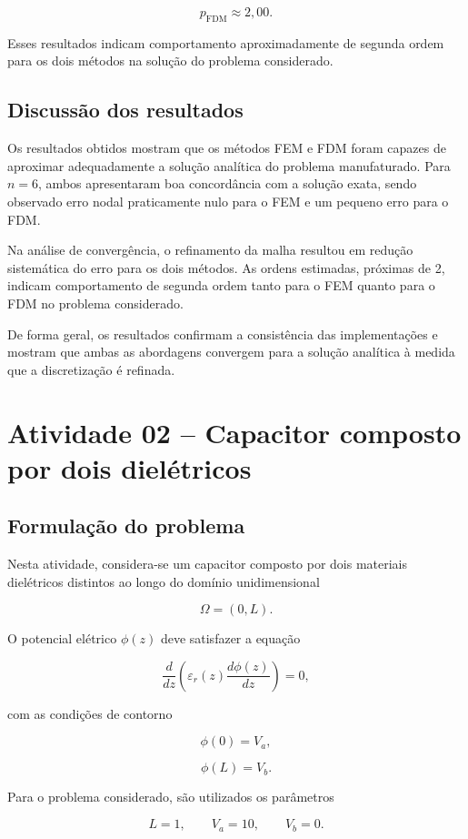 \[
p_{\mathrm{FDM}} \approx 2,00.
\]

Esses resultados indicam comportamento aproximadamente de segunda ordem para os dois métodos na solução do problema considerado.

\subsection{Discussão dos resultados}

Os resultados obtidos mostram que os métodos FEM e FDM foram capazes de aproximar adequadamente a solução analítica do problema manufaturado. Para \(n=6\), ambos apresentaram boa concordância com a solução exata, sendo observado erro nodal praticamente nulo para o FEM e um pequeno erro para o FDM.

Na análise de convergência, o refinamento da malha resultou em redução sistemática do erro para os dois métodos. As ordens estimadas, próximas de 2, indicam comportamento de segunda ordem tanto para o FEM quanto para o FDM no problema considerado.

De forma geral, os resultados confirmam a consistência das implementações e mostram que ambas as abordagens convergem para a solução analítica à medida que a discretização é refinada.

\section{Atividade 02 -- Capacitor composto por dois dielétricos}

\subsection{Formulação do problema}

Nesta atividade, considera-se um capacitor composto por dois materiais dielétricos distintos ao longo do domínio unidimensional

\[
\Omega = (0,L).
\]

O potencial elétrico \(\phi(z)\) deve satisfazer a equação

\[
\frac{d}{dz}
\left(
\varepsilon_r(z)
\frac{d\phi(z)}{dz}
\right)
=0,
\]

com as condições de contorno

\[
\phi(0)=V_a,
\]

\[
\phi(L)=V_b.
\]

Para o problema considerado, são utilizados os parâmetros

\[
L=1,
\qquad
V_a=10,
\qquad
V_b=0.
\]

